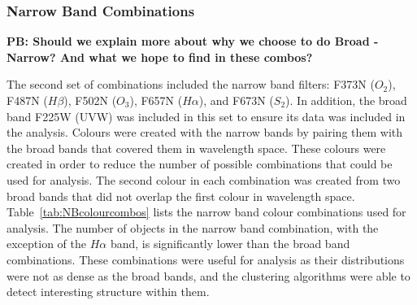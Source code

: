 \subsubsection{Narrow Band Combinations}

\textbf{PB: Should we explain more about why we choose to do Broad - Narrow? And what we hope to find in these combos?}

The second set of combinations included the narrow band filters: F373N ($O_{2}$), F487N ($H\beta$), F502N ($O_{3}$), F657N ($H\alpha$), and F673N ($S_{2}$).
In addition, the broad band F225W (UVW) was included in this set to ensure its data was included in the analysis. 
Colours were created with the narrow bands by pairing them with the broad bands that covered them in wavelength space.
These colours were created in order to reduce the number of possible combinations that could be used for analysis.
The second colour in each combination was created from two broad bands that did not overlap the first colour in wavelength space.
Table~\ref{tab:NBcolourcombos} lists the narrow band colour combinations used for analysis.
The number of objects in the narrow band combination, with the exception of the $H\alpha$ band, is significantly lower than the broad band combinations.
These combinations were useful for analysis as their distributions were not as dense as the broad bands, and the clustering algorithms were able to detect interesting structure within them.


